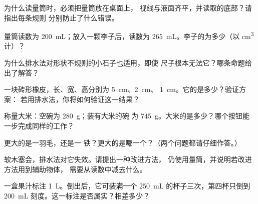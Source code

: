 \begin{exercise}[$\star$]\label{exo:g6:mass-and-volume:3}
为什么读量筒时，必须把量筒放在桌面上，
视线与液面齐平，并读取的底部？请指出每条规则
分别防止了什么错误。
\end{exercise}

\begin{exercise}[$\star$]\label{exo:g6:mass-and-volume:4}
量筒读数为 \qty{200}{mL}；放入一颗李子后，读数为
\qty{265}{mL}。李子的为多少（以 \unit{cm^3} 计）？
\end{exercise}

\begin{exercise}[$\star$]\label{exo:g6:mass-and-volume:5}
为什么排水法对形状不规则的小石子也适用，即使
尺子根本无法它？哪条命题给出了解答？
\end{exercise}

\begin{exercise}[$\star$]\label{exo:g6:mass-and-volume:6}
一块砖形橡皮，长、宽、高分别为 \qty{5}{cm}、\qty{2}{cm}、
\qty{1}{cm}。它的是多少？验证方案：
若用排水法，你将如何验证这一结果？
\end{exercise}

\begin{exercise}[$\star$]\label{exo:g6:mass-and-volume:7}
称量大米：空碗为 \qty{280}{g}；装有大米的碗
为 \qty{745}{g}。大米的是多少？哪个按钮能
一步完成同样的工作？
\end{exercise}

\begin{exercise}[$\star$]\label{exo:g6:mass-and-volume:8}
更大的是一羽毛，还是一
铁？更大的是哪一个？（两个问题都请仔细作答。）
\end{exercise}

\begin{exercise}[$\star\star$]\label{exo:g6:mass-and-volume:9}
软木塞会，排水法对它失效。请提出一种改进方法，
仍使用量筒，并说明若改进方法用到辅助物体，
需要从读数中减去什么。
\end{exercise}

\begin{exercise}[$\star\star$]\label{exo:g6:mass-and-volume:10}
一盒果汁标注 \qty{1}{L}。倒出后，它可装满一个
\qty{250}{mL} 的杯子三次，第四杯只倒到
\qty{200}{mL} 刻度。这一标注是否属实？相差多少？
\end{exercise}

